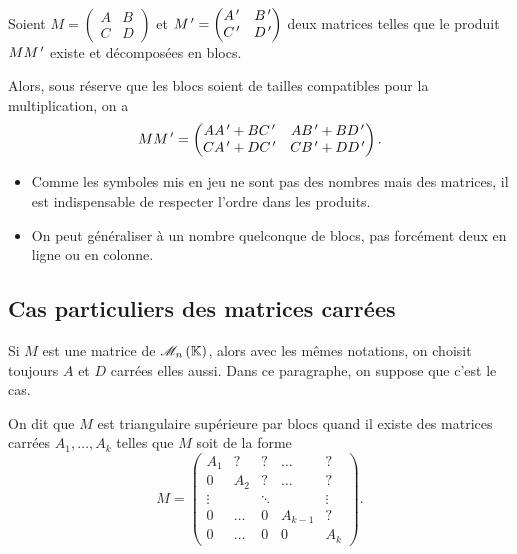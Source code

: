 \begin{prop}~\\
Soient \(M=\begin{pmatrix}
A & B \\
C & D
\end{pmatrix}\) et \(M^{\,\prime}=\begin{pmatrix}
A^{\,\prime} & B^{\,\prime} \\
C^{\,\prime} & D^{\,\prime}
\end{pmatrix}\) deux matrices telles que le produit \(MM^{\,\prime}\) existe et décomposées en blocs.

Alors, sous réserve que les blocs soient de tailles compatibles pour la multiplication, on a \[MM^{\,\prime}=\begin{pmatrix}
AA^{\,\prime}+BC^{\,\prime} & AB^{\,\prime}+BD^{\,\prime} \\
CA^{\,\prime}+DC^{\,\prime} & CB^{\,\prime}+DD^{\,\prime}
\end{pmatrix}.\]
\end{prop}

\begin{rem}
\begin{itemize}
    \item Comme les symboles mis en jeu ne sont pas des nombres mais des matrices, il est indispensable de respecter l'ordre dans les produits. \\
    \item On peut généraliser à un nombre quelconque de blocs, pas forcément deux en ligne ou en colonne.
\end{itemize}
\end{rem}

\subsection{Cas particuliers des matrices carrées}

Si \(M\) est une matrice de \(\M{n}\), alors avec les mêmes notations, on choisit toujours \(A\) et \(D\) carrées elles aussi. Dans ce paragraphe, on suppose que c'est le cas.

\begin{defi}
On dit que \(M\) est triangulaire supérieure par blocs quand il existe des matrices carrées \(A_1,\dots,A_k\) telles que \(M\) soit de la forme \[M=\begin{pmatrix}
A_1 & ? & ? & \dots & ? \\
0 & A_2 & ? & \dots & ? \\
\vdots &  & \ddots &  & \vdots \\
0 & \dots & 0 & A_{k-1} & ? \\
0 & \dots & 0 & 0 & A_k
\end{pmatrix}.\]
\end{defi}

